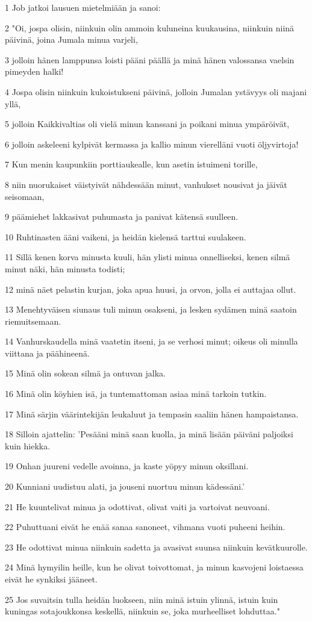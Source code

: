 \par 1 Job jatkoi lausuen mietelmiään ja sanoi:
\par 2 "Oi, jospa olisin, niinkuin olin ammoin kuluneina kuukausina, niinkuin niinä päivinä, joina Jumala minua varjeli,
\par 3 jolloin hänen lamppunsa loisti pääni päällä ja minä hänen valossansa vaelsin pimeyden halki!
\par 4 Jospa olisin niinkuin kukoistukseni päivinä, jolloin Jumalan ystävyys oli majani yllä,
\par 5 jolloin Kaikkivaltias oli vielä minun kanssani ja poikani minua ympäröivät,
\par 6 jolloin askeleeni kylpivät kermassa ja kallio minun vierelläni vuoti öljyvirtoja!
\par 7 Kun menin kaupunkiin porttiaukealle, kun asetin istuimeni torille,
\par 8 niin nuorukaiset väistyivät nähdessään minut, vanhukset nousivat ja jäivät seisomaan,
\par 9 päämiehet lakkasivat puhumasta ja panivat kätensä suulleen.
\par 10 Ruhtinasten ääni vaikeni, ja heidän kielensä tarttui suulakeen.
\par 11 Sillä kenen korva minusta kuuli, hän ylisti minua onnelliseksi, kenen silmä minut näki, hän minusta todisti;
\par 12 minä näet pelastin kurjan, joka apua huusi, ja orvon, jolla ei auttajaa ollut.
\par 13 Menehtyväisen siunaus tuli minun osakseni, ja lesken sydämen minä saatoin riemuitsemaan.
\par 14 Vanhurskaudella minä vaatetin itseni, ja se verhosi minut; oikeus oli minulla viittana ja päähineenä.
\par 15 Minä olin sokean silmä ja ontuvan jalka.
\par 16 Minä olin köyhien isä, ja tuntemattoman asiaa minä tarkoin tutkin.
\par 17 Minä särjin väärintekijän leukaluut ja tempasin saaliin hänen hampaistansa.
\par 18 Silloin ajattelin: 'Pesääni minä saan kuolla, ja minä lisään päiväni paljoiksi kuin hiekka.
\par 19 Onhan juureni vedelle avoinna, ja kaste yöpyy minun oksillani.
\par 20 Kunniani uudistuu alati, ja jouseni nuortuu minun kädessäni.'
\par 21 He kuuntelivat minua ja odottivat, olivat vaiti ja vartoivat neuvoani.
\par 22 Puhuttuani eivät he enää sanaa sanoneet, vihmana vuoti puheeni heihin.
\par 23 He odottivat minua niinkuin sadetta ja avasivat suunsa niinkuin kevätkuurolle.
\par 24 Minä hymyilin heille, kun he olivat toivottomat, ja minun kasvojeni loistaessa eivät he synkiksi jääneet.
\par 25 Jos suvaitsin tulla heidän luokseen, niin minä istuin ylinnä, istuin kuin kuningas sotajoukkonsa keskellä, niinkuin se, joka murheelliset lohduttaa."

